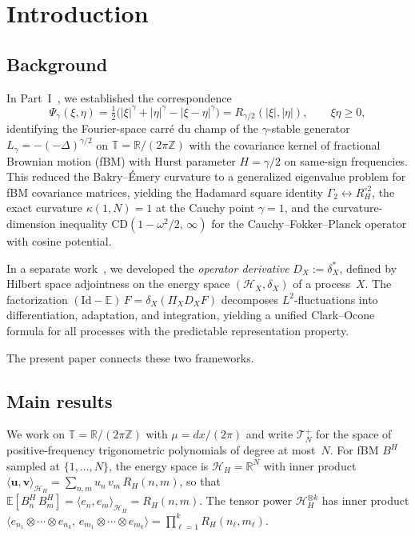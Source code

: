 \documentclass[11pt,a4paper]{article}
\theoremstyle{plain}
\theoremstyle{definition}
\theoremstyle{remark}
\newcommand{\E}{\mathbb{E}}
\newcommand{\R}{\mathbb{R}}
\newcommand{\Z}{\mathbb{Z}}
\newcommand{\T}{\mathbb{T}}
\newcommand{\HH}{\mathcal{H}_H}
\newcommand{\Id}{\mathrm{Id}}
\begin{document}
\section{Introduction}\label{sec:intro}

\subsection{Background}

In Part~I~\cite{Fontes2026b}, we established the correspondence
\begin{equation}\label{eq:part1-duality}
  \Psi_\gamma(\xi,\eta)
  = \tfrac{1}{2}\bigl(|\xi|^\gamma + |\eta|^\gamma
    - |\xi - \eta|^\gamma\bigr)
  = R_{\gamma/2}(|\xi|,|\eta|),
  \qquad \xi\eta \geq 0,
\end{equation}
identifying the Fourier-space carr\'e du champ of the
$\gamma$-stable generator $L_\gamma = -(-\Delta)^{\gamma/2}$
on $\T = \R/(2\pi\Z)$ with the covariance kernel of fractional
Brownian motion (fBM) with Hurst parameter $H = \gamma/2$ on
same-sign frequencies.  This reduced the Bakry--\'Emery curvature
to a generalized eigenvalue problem for fBM covariance matrices,
yielding the Hadamard square identity
$\Gamma_2 \leftrightarrow R_H^{\circ 2}$,
the exact curvature $\kappa(1,N) = 1$ at the Cauchy point
$\gamma = 1$, and the curvature-dimension inequality
$\mathrm{CD}(1-\omega^2/2,\,\infty)$ for the
Cauchy--Fokker--Planck operator with cosine potential.

In a separate work~\cite{Fontes2026opderiv}, we developed the
\emph{operator derivative} $D_X := \delta_X^*$, defined by
Hilbert space adjointness on the energy space $(\mathcal{H}_X,
\delta_X)$ of a process~$X$.  The factorization
$(\Id - \E)\,F = \delta_X(\Pi_X D_X F)$
decomposes $L^2$-fluctuations into differentiation, adaptation,
and integration, yielding a unified Clark--Ocone formula for
all processes with the predictable representation property.

The present paper connects these two frameworks.


\subsection{Main results}

We work on $\T = \R/(2\pi\Z)$ with $\mu = dx/(2\pi)$
and write $\mathcal{T}_N^+$ for the space of
positive-frequency trigonometric polynomials of degree at
most~$N$.  For fBM $B^H$ sampled at $\{1,\ldots,N\}$,
the energy space is $\HH = \R^N$ with inner product
$\langle \mathbf{u}, \mathbf{v} \rangle_{\HH}
= \sum_{n,m} u_n\,v_m\,R_H(n,m)$, so that
$\E[B_n^H\,B_m^H] = \langle e_n, e_m \rangle_{\HH}
= R_H(n,m)$.
The tensor power $\HH^{\otimes k}$ has inner product
$\langle e_{n_1} \otimes \cdots \otimes e_{n_k},\,
e_{m_1} \otimes \cdots \otimes e_{m_k} \rangle
= \prod_{\ell=1}^k R_H(n_\ell, m_\ell)$.
\end{document}

